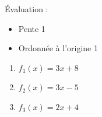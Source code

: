 %
%
    Évaluation :
    \begin{itemize}
        \item Pente \hfill 1
        \item Ordonnée à l'origine \hfill 1
    \end{itemize}
    \begin{enumerate}[cols=3]
        \item $f_1(x) = 3x + 8$
        \item $f_2(x) = 3x - 5$
        \item $f_3(x) = 2x + 4$
    \end{enumerate}
